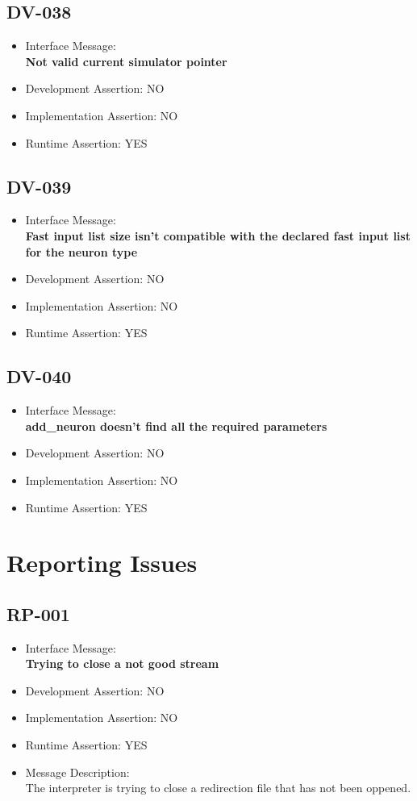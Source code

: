 \subsection{DV-038}
\begin{itemize}
  \item Interface Message:\\[1em]
    \textbf{Not valid current simulator pointer}
  \item Development Assertion: NO
  \item Implementation Assertion: NO
  \item Runtime Assertion: YES
\end{itemize}

\subsection{DV-039}
\begin{itemize}
  \item Interface Message:\\[1em]
    \textbf{Fast input list size isn't compatible with the declared fast input list for the neuron type}
  \item Development Assertion: NO
  \item Implementation Assertion: NO
  \item Runtime Assertion: YES
\end{itemize}

\subsection{DV-040}
\begin{itemize}
  \item Interface Message:\\[1em]
    \textbf{add\_neuron doesn't find all the required parameters}
  \item Development Assertion: NO
  \item Implementation Assertion: NO
  \item Runtime Assertion: YES
\end{itemize}

\section{Reporting Issues}

\subsection{RP-001}
\begin{itemize}
  \item Interface Message:\\[1em]
    \textbf{Trying to close a not good stream}
  \item Development Assertion: NO
  \item Implementation Assertion: NO
  \item Runtime Assertion: YES
  \item Message Description:\\[1em]
    The interpreter is trying to close a redirection file that has not been oppened.
\end{itemize}

